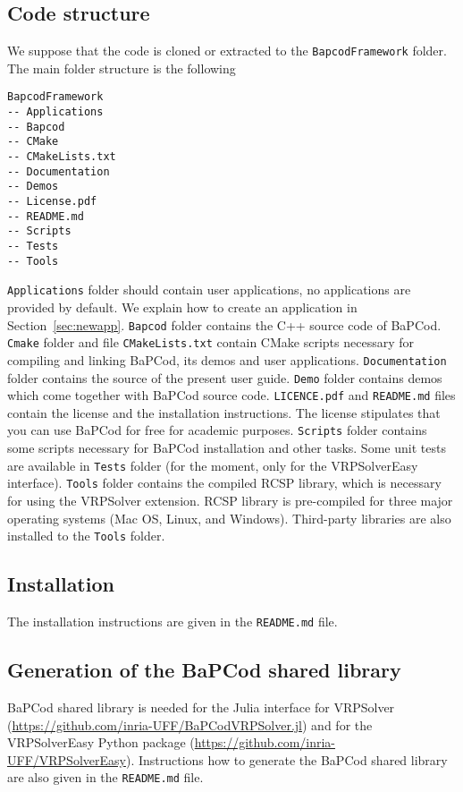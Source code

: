 \documentclass[10pt,a4paper]{article}
\newcommand{\bc}{BaPCod\xspace}
\begin{document}
\subsection{Code structure}
\label{sec:install}

We suppose that the code is
cloned or extracted to the \verb+BapcodFramework+ folder. The main folder structure is the following

\begin{Verbatim}
BapcodFramework
-- Applications
-- Bapcod
-- CMake
-- CMakeLists.txt
-- Documentation
-- Demos
-- License.pdf
-- README.md
-- Scripts
-- Tests
-- Tools
\end{Verbatim}

\verb+Applications+ folder should contain user applications, no applications are provided by default. We explain how to
create an application in Section~\ref{sec:newapp}. \verb+Bapcod+ folder contains the C++ source code of
\bc. \verb+Cmake+ folder and file \verb+CMakeLists.txt+ contain CMake scripts necessary for compiling and linking \bc,
its demos and user applications. \verb+Documentation+ folder contains the source of the present user guide. \verb+Demo+
folder contains demos which come together with \bc source code.  \verb+LICENCE.pdf+ and \verb+README.md+ files contain
the license and the installation instructions. The license stipulates that you can use \bc for free for academic
purposes. \verb+Scripts+ folder contains some scripts necessary for \bc installation and other tasks.
Some unit tests are available in \verb+Tests+ folder (for the moment, only for the VRPSolverEasy interface). \verb+Tools+
folder contains the compiled RCSP library, which is necessary for using the VRPSolver extension. RCSP library is pre-compiled for three major operating systems (Mac OS, Linux, and Windows). Third-party libraries are also installed to the \verb+Tools+ folder.

\subsection{Installation}
\label{sec:install}

The installation instructions are given in the \verb+README.md+ file. 

\subsection{Generation of the BaPCod shared library}
\label{sec:shared}

BaPCod shared library is needed for the Julia interface for VRPSolver (\url{https://github.com/inria-UFF/BaPCodVRPSolver.jl}) and for the VRPSolverEasy Python package (\url{https://github.com/inria-UFF/VRPSolverEasy}). Instructions how to generate the BaPCod shared library are also given in the \verb+README.md+ file.
\end{document}
